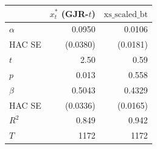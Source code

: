 \begin{tabular}{lrr}\toprule
 & $x^*_t$ (GJR-$t$) & $\text{xs\_scaled\_bt}$ \\\midrule
$\alpha$ & 0.0950 & 0.0106 \\
\quad HAC SE & (0.0380) & (0.0181) \\
\quad $t$ & 2.50 & 0.59 \\
\quad $p$ & 0.013 & 0.558 \\
$\beta$ & 0.5043 & 0.4329 \\
\quad HAC SE & (0.0336) & (0.0165) \\
$R^2$ & 0.849 & 0.942 \\
$T$ & 1172 & 1172 \\
\bottomrule\end{tabular}

